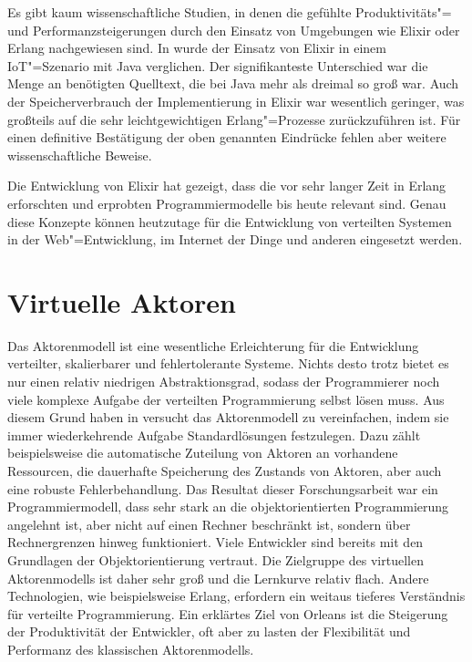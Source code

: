 Es gibt kaum wissenschaftliche Studien, in denen die gefühlte Produktivitäts"= und Performanzsteigerungen durch den Einsatz von Umgebungen wie Elixir oder Erlang nachgewiesen sind. In \cite{ElixirIot} wurde der Einsatz von Elixir in einem IoT"=Szenario mit Java verglichen. Der signifikanteste Unterschied war die Menge an benötigten Quelltext, die bei Java mehr als dreimal so groß war. Auch der Speicherverbrauch der Implementierung in Elixir war wesentlich geringer, was großteils auf die sehr leichtgewichtigen Erlang"=Prozesse zurückzuführen ist. Für einen definitive Bestätigung der oben genannten Eindrücke fehlen aber weitere wissenschaftliche Beweise.

Die Entwicklung von Elixir hat gezeigt, dass die vor sehr langer Zeit in Erlang erforschten und erprobten Programmiermodelle bis heute relevant sind. Genau diese Konzepte können heutzutage für die Entwicklung von verteilten Systemen in der Web"=Entwicklung, im Internet der Dinge und anderen eingesetzt werden.

\section{Virtuelle Aktoren}

Das Aktorenmodell ist eine wesentliche Erleichterung für die Entwicklung verteilter, skalierbarer und fehlertolerante Systeme. Nichts desto trotz bietet es nur einen relativ niedrigen Abstraktionsgrad, sodass der Programmierer noch viele komplexe Aufgabe der verteilten Programmierung selbst lösen muss. Aus diesem Grund haben \citeauthor{virtualActors} in \cite{virtualActors} versucht das Aktorenmodell zu vereinfachen, indem sie immer wiederkehrende Aufgabe Standardlösungen festzulegen. Dazu zählt beispielsweise die automatische Zuteilung von Aktoren an vorhandene Ressourcen, die dauerhafte Speicherung des Zustands von Aktoren, aber auch eine robuste Fehlerbehandlung. Das Resultat dieser Forschungsarbeit war ein Programmiermodell, dass sehr stark an die objektorientierten Programmierung angelehnt ist, aber nicht auf einen Rechner beschränkt ist, sondern über Rechnergrenzen hinweg funktioniert. Viele Entwickler sind bereits mit den Grundlagen der Objektorientierung vertraut. Die Zielgruppe des virtuellen Aktorenmodells ist daher sehr groß und die Lernkurve relativ flach. Andere Technologien, wie beispielsweise Erlang, erfordern ein weitaus tieferes Verständnis für verteilte Programmierung. Ein erklärtes Ziel von Orleans ist die Steigerung der Produktivität der Entwickler, oft aber zu lasten der Flexibilität und Performanz des klassischen Aktorenmodells.

